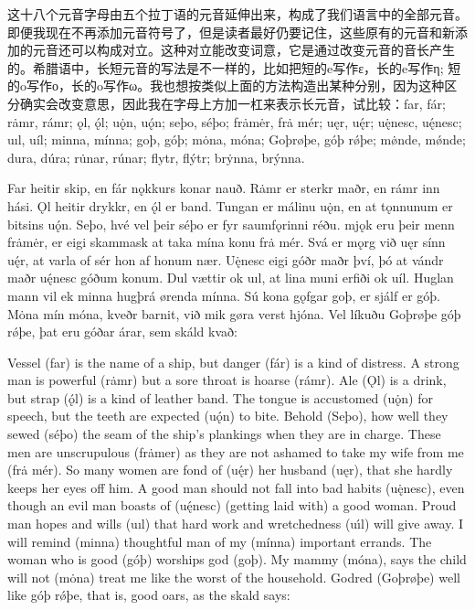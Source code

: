 \begin{translation*}{}
  这十八个元音字母由五个拉丁语的元音延伸出来，构成了我们语言中的全部元音。即便我现在不再添加元音符号了，但是读者最好仍要记住，这些原有的元音和新添加的元音还可以构成对立。这种对立能改变词意，它是通过改变元音的音长产生的。希腊语中，长短元音的写法是不一样的，比如把短的e写作ε，长的e写作η; 短的o写作ο，长的o写作ω。我也想按类似上面的方法构造出某种分别，因为这种区分确实会改变意思，因此我在字母上方加一杠来表示长元音，试比较：far, fár; rȧmr, rámr; ǫl, ǫ́l; uǫ̇n, uǫ́n; seþo, séþo; frȧmėr, frȧ mér; uęr, uę́r; uę̇nesc, uę́nesc; uıl, uíl; minna, mínna; goþ, góþ; mȯna, móna; Goþrøþe, góþ rǿþe; mø̇nde, mǿnde; dura, dúra; ru̇nar, rúnar; flytr, flýtr; brẏnna, brýnna.
\end{translation*}
\begin{paracol}{2}
  Far heitir skip, en fár nǫkkurs konar nauð. Rȧmr er sterkr maðr, en rámr inn hási. Ǫl heitir drykkr, en ǫ́l er band. Tungan er málinu uǫ̇n, en at tǫnnunum er bitsins uǫ́n. Seþo, hvé vel þeir séþo er fyr saumfǫrinni réðu. mjǫk eru þeir menn frȧmėr, er eigi skammask at taka mína konu frȧ mér. Svá er mǫrg við uęr sínn uę́r, at varla of sér hon af honum nær. Uę̇nesc eigi góðr maðr því, þó at vándr maðr uę́nesc góðum konum. Dul vættir ok uıl, at lina muni erfiði ok uíl. Huglan mann vil ek minna hugþrá ørenda mínna. Sú kona gǫfgar goþ, er sjálf er góþ. Mȯna mín móna, kveðr barnit, við mik gøra verst hjóna. Vel líkuðu Goþrøþe góþ rǿþe, þat eru góðar árar, sem skáld kvað:

  \switchcolumn

  Vessel (far) is the name of a ship, but danger (fár) is a kind of distress. A strong man is powerful (rȧmr) but a sore throat is hoarse (rámr). Ale (Ǫl) is a drink, but strap (ǫ́l) is a kind of leather band. The tongue is accustomed (u\.{ǫ}n) for speech, but the teeth are expected (u\'{ǫ}n) to bite. Behold (Seþo), how well they sewed (séþo) the seam of the ship's plankings when they are in charge. These men are unscrupulous (frȧmer) as they are not ashamed to take my wife from me (frȧ mér). So many women are fond of (uę́r) her husband (uęr), that she hardly keeps her eyes off him. A good man should not fall into bad habits (uę̇nesc), even though an evil man boasts of (uę́nesc) (getting laid with) a good woman. Proud man hopes and wills (uıl) that hard work and wretchedness (u\'{ı}l) will give away. I will remind (minna) thoughtful man of my (mínna) important errands. The woman who is good (góþ) worships god (goþ). My mammy (móna), says the child will not (mȯna) treat me like the worst of the household. Godred (Goþrøþe) well like góþ rǿþe, that is, good oars, as the skald says:


\end{paracol}
